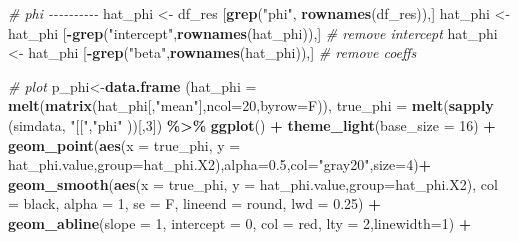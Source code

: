 \documentclass[
]{article}
\newenvironment{Shaded}{\begin{snugshade}}{\end{snugshade}}
\newcommand{\AttributeTok}[1]{\textcolor[rgb]{0.13,0.29,0.53}{#1}}
\newcommand{\CommentTok}[1]{\textcolor[rgb]{0.56,0.35,0.01}{\textit{#1}}}
\newcommand{\DecValTok}[1]{\textcolor[rgb]{0.00,0.00,0.81}{#1}}
\newcommand{\FloatTok}[1]{\textcolor[rgb]{0.00,0.00,0.81}{#1}}
\newcommand{\FunctionTok}[1]{\textcolor[rgb]{0.13,0.29,0.53}{\textbf{#1}}}
\newcommand{\NormalTok}[1]{#1}
\newcommand{\OtherTok}[1]{\textcolor[rgb]{0.56,0.35,0.01}{#1}}
\newcommand{\SpecialCharTok}[1]{\textcolor[rgb]{0.81,0.36,0.00}{\textbf{#1}}}
\newcommand{\StringTok}[1]{\textcolor[rgb]{0.31,0.60,0.02}{#1}}
\begin{document}
{\begin{Shaded}
\begin{Highlighting}[]
\CommentTok{\# phi {-}{-}{-}{-}{-}{-}{-}{-}{-}{-}}
\NormalTok{hat\_phi }\OtherTok{\textless{}{-}}\NormalTok{ df\_res [}\FunctionTok{grep}\NormalTok{(}\StringTok{"phi"}\NormalTok{, }\FunctionTok{rownames}\NormalTok{(df\_res)),]}
\NormalTok{hat\_phi }\OtherTok{\textless{}{-}}\NormalTok{ hat\_phi [}\SpecialCharTok{{-}}\FunctionTok{grep}\NormalTok{(}\StringTok{"intercept"}\NormalTok{,}\FunctionTok{rownames}\NormalTok{(hat\_phi)),] }\CommentTok{\# remove intercept}
\NormalTok{hat\_phi }\OtherTok{\textless{}{-}}\NormalTok{ hat\_phi [}\SpecialCharTok{{-}}\FunctionTok{grep}\NormalTok{(}\StringTok{"beta"}\NormalTok{,}\FunctionTok{rownames}\NormalTok{(hat\_phi)),] }\CommentTok{\# remove coeffs}

\CommentTok{\# plot}
\NormalTok{p\_phi}\OtherTok{\textless{}{-}}\FunctionTok{data.frame}\NormalTok{ (}\AttributeTok{hat\_phi =} \FunctionTok{melt}\NormalTok{(}\FunctionTok{matrix}\NormalTok{(hat\_phi[,}\StringTok{"mean"}\NormalTok{],}\AttributeTok{ncol=}\DecValTok{20}\NormalTok{,}\AttributeTok{byrow=}\NormalTok{F)),}
                   \AttributeTok{true\_phi =} \FunctionTok{melt}\NormalTok{(}\FunctionTok{sapply}\NormalTok{ (simdata, }\StringTok{"[["}\NormalTok{,}\StringTok{"phi"}\NormalTok{ ))[,}\DecValTok{3}\NormalTok{]) }\SpecialCharTok{\%\textgreater{}\%}
  \FunctionTok{ggplot}\NormalTok{() }\SpecialCharTok{+}
  \FunctionTok{theme\_light}\NormalTok{(}\AttributeTok{base\_size =} \DecValTok{16}\NormalTok{) }\SpecialCharTok{+}
  \FunctionTok{geom\_point}\NormalTok{(}\FunctionTok{aes}\NormalTok{(}\AttributeTok{x =}\NormalTok{ true\_phi, }\AttributeTok{y =}\NormalTok{ hat\_phi.value,}\AttributeTok{group=}\NormalTok{hat\_phi.X2),}\AttributeTok{alpha=}\FloatTok{0.5}\NormalTok{,}\AttributeTok{col=}\StringTok{"gray20"}\NormalTok{,}\AttributeTok{size=}\DecValTok{4}\NormalTok{)}\SpecialCharTok{+}
  \FunctionTok{geom\_smooth}\NormalTok{(}\FunctionTok{aes}\NormalTok{(}\AttributeTok{x =}\NormalTok{ true\_phi, }\AttributeTok{y =}\NormalTok{ hat\_phi.value,}\AttributeTok{group=}\NormalTok{hat\_phi.X2), }\AttributeTok{col =} \StringTok{\textquotesingle{}black\textquotesingle{}}\NormalTok{, }\AttributeTok{alpha =} \DecValTok{1}\NormalTok{, }\AttributeTok{se =}\NormalTok{ F, }
              \AttributeTok{lineend =} \StringTok{\textquotesingle{}round\textquotesingle{}}\NormalTok{, }\AttributeTok{lwd =} \FloatTok{0.25}\NormalTok{) }\SpecialCharTok{+}
  \FunctionTok{geom\_abline}\NormalTok{(}\AttributeTok{slope =} \DecValTok{1}\NormalTok{, }\AttributeTok{intercept =} \DecValTok{0}\NormalTok{, }\AttributeTok{col =} \StringTok{\textquotesingle{}red\textquotesingle{}}\NormalTok{, }\AttributeTok{lty =} \DecValTok{2}\NormalTok{,}\AttributeTok{linewidth=}\DecValTok{1}\NormalTok{) }\SpecialCharTok{+}

\end{Highlighting}
\end{Shaded}}
\end{document}
